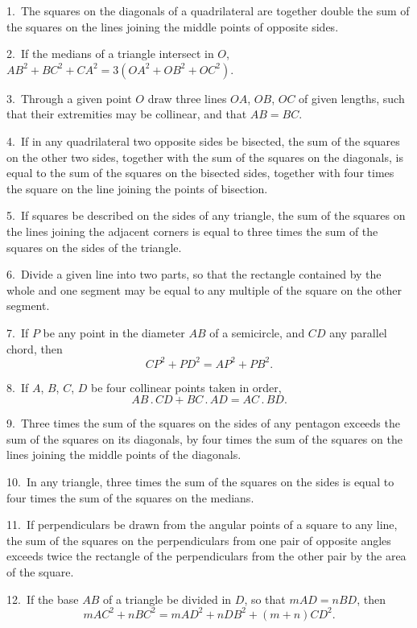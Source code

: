 \documentclass[oneside]{book}
\begin{document}
\begin{footnotesize}
1.~The squares on the diagonals of a quadrilateral are together
double the sum of the squares on the lines joining the middle
points of opposite sides.

2.~If the medians of a triangle intersect in $O$, $AB^{2} + BC^{2} + CA^{2}
=3(OA^{2} + OB^{2} + OC^{2})$.

3.~Through a given point $O$ draw three lines $OA$, $OB$, $OC$ of
given lengths, such that their extremities may be collinear, and
that $AB = BC$.

4.~If in any quadrilateral two opposite sides be bisected, the
sum of the squares on the other two sides, together with the sum
of the squares on the diagonals, is equal to the sum of the squares
on the bisected sides, together with four times the square on the
line joining the points of bisection.

5.~If squares be described on the sides of any triangle, the
sum of the squares on the lines joining the adjacent corners is
equal to three times the sum of the squares on the sides of the
triangle.



6.~Divide a given line into two parts, so that the rectangle
contained by the whole and one segment may be equal to any
multiple of the square on the other segment.

7.~If $P$ be any point in the diameter $AB$ of a semicircle, and
$CD$ any parallel chord, then
\[
CP^2 + PD^2 = AP^2 + PB^2.
\]

8.~If $A$, $B$, $C$, $D$ be four collinear points taken in order,
\[
AB\,.\,CD + BC\,.\,AD = AC\,.\,BD.
\]

9.~Three times the sum of the squares on the sides of any
pentagon exceeds the sum of the squares on its diagonals, by four
times the sum of the squares on the lines joining the middle
points of the diagonals.

10.~In any triangle, three times the sum of the squares on the
sides is equal to four times the sum of the squares on the medians.

11.~If perpendiculars be drawn from the angular points of a
square to any line, the sum of the squares on the perpendiculars
from one pair of opposite angles exceeds twice the rectangle
of the perpendiculars from the other pair by the area of the
square.

12.~If the base $AB$ of a triangle be divided in $D$, so that $mAD
= nBD$, then
\[
mAC^2 + nBC^2 = mAD^2 + nDB^2 + (m + n) CD^2.
\]


\end{footnotesize}
\end{document}
